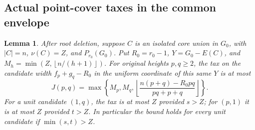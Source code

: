 \documentclass[11pt,a4paper]{article}
\newcommand{\floor}[1]{\left\lfloor#1\right\rfloor}
\newtheorem{lemma}[theorem]{Lemma}
\theoremstyle{definition}
\begin{document}
\subsection{Actual point-cover taxes in the common envelope}
\begin{lemma}\label{lem:point-cover-tax}
After root deletion, suppose $C$ is an isolated core union in $G_0$, with $|C|=n$, $\nu(C)=Z$, and $P_{r_0}(G_0)$. Put $R_0=r_0-1$, $Y=G_0-E(C)$, and $M_h=\min(Z,\floor{n/(h+1)})$. For original heights $p,q\ge2$, the tax on the candidate width $f_p+g_q-R_0$ in the uniform coordinate of this same $Y$ is at most
\[
J(p,q)=\max\left\{M_p,M_q,
\floor{\frac{n(p+q)-R_0pq}{pq+p+q}}\right\}.
\]
For a unit candidate $(1,q)$, the tax is at most $Z$ provided $s>Z$; for $(p,1)$ it is at most $Z$ provided $t>Z$. In particular the bound holds for every unit candidate if $\min(s,t)>Z$.
\end{lemma}
\end{document}
